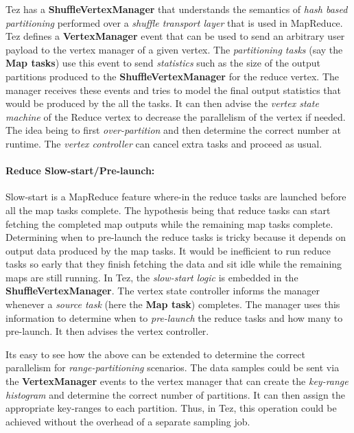 \documentclass[twocolumn]{article}
\begin{document}
Tez has a \textbf{ShuffleVertexManager} that understands the semantics
of \emph{hash based partitioning} performed over a \emph{shuffle
transport layer} that is used in MapReduce. Tez defines a
\textbf{VertexManager} event that can be used to send an arbitrary user
payload to the vertex manager of a given vertex. The \emph{partitioning
tasks} (say the \textbf{Map tasks}) use this event to send
\emph{statistics} such as the size of the output partitions produced to
the \textbf{ShuffleVertexManager} for the reduce vertex. The manager
receives these events and tries to model the final output statistics
that would be produced by the all the tasks. It can then advise the
\emph{vertex state machine} of the Reduce vertex to decrease the
parallelism of the vertex if needed. The idea being to first
\emph{over-partition} and then determine the correct number at runtime.
The \emph{vertex controller} can cancel extra tasks and proceed as
usual.

\paragraph{Reduce Slow-start/Pre-launch:}

Slow-start is a MapReduce feature where-in the reduce tasks are launched
before all the map tasks complete. The hypothesis being that reduce
tasks can start fetching the completed map outputs while the remaining
map tasks complete. Determining when to pre-launch the reduce tasks is
tricky because it depends on output data produced by the map tasks. It
would be inefficient to run reduce tasks so early that they finish
fetching the data and sit idle while the remaining maps are still
running. In Tez, the \emph{slow-start logic} is embedded in the
\textbf{ShuffleVertexManager}. The vertex state controller informs the
manager whenever a \emph{source task} (here the \textbf{Map task})
completes. The manager uses this information to determine when to
\emph{pre-launch} the reduce tasks and how many to pre-launch. It then
advises the vertex controller.

Its easy to see how the above can be extended to determine the correct
parallelism for \emph{range-partitioning} scenarios. The data samples
could be sent via the \textbf{VertexManager} events to the vertex
manager that can create the \emph{key-range histogram} and determine the
correct number of partitions. It can then assign the appropriate
key-ranges to each partition. Thus, in Tez, this operation could be
achieved without the overhead of a separate sampling job.
\end{document}
